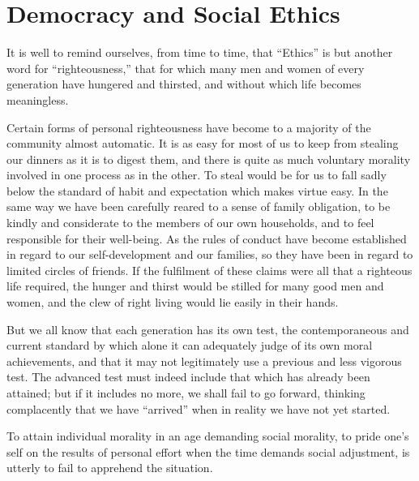 
\author{Jane Addams}
\chapter[Democracy and Social Ethics, chap. 1]{Democracy and Social Ethics}


\noindent It is well to remind ourselves, from time to time,
that ``Ethics'' is but another word for ``righteousness,'' that for
which many men and women of every generation have hungered and
thirsted, and without which life becomes meaningless.

Certain forms of personal righteousness have become to a majority of
the community almost automatic. It is as easy for most of us to keep
from stealing our dinners as it is to digest them, and there is quite
as much voluntary morality involved in one process as in the other. To
steal would be for us to fall sadly below the standard of habit and
expectation which makes virtue easy. In the same way we have been
carefully reared to a sense  of family obligation, to be
kindly and considerate to the members of our own households, and to
feel responsible for their well-being. As the rules of conduct have
become established in regard to our self-development and our families,
so they have been in regard to limited circles of friends. If the
fulfilment of these claims were all that a righteous life required,
the hunger and thirst would be stilled for many good men and women,
and the clew of right living would lie easily in their hands.

But we all know that each generation has its own test, the
contemporaneous and current standard by which alone it can adequately
judge of its own moral achievements, and that it may not legitimately
use a previous and less vigorous test. The advanced test must indeed
include that which has already been attained; but if it includes no
more, we shall fail to go forward, thinking complacently that we have
``arrived'' when in reality we have not yet started.

To attain individual morality in an age  demanding social
morality, to pride one's self on the results of personal effort when
the time demands social adjustment, is utterly to fail to apprehend
the situation.

